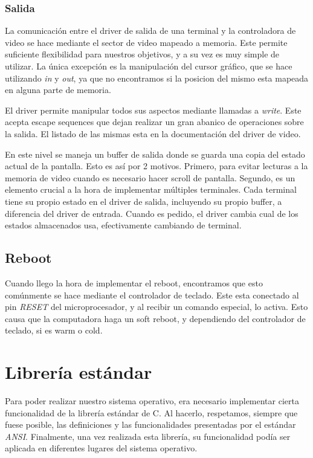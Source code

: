\documentclass[a4paper,10pt]{article}
\begin{document}
        \subsubsection{Salida}
            La comunicación entre el driver de salida de una terminal y la controladora de video se hace mediante el sector de video mapeado a memoria.
            Este permite suficiente flexibilidad para nuestros objetivos, y a su vez es muy simple de utilizar.
            La única excepción es la manipulación del cursor gráfico, que se hace utilizando \textit{in} y \textit{out}, ya que no encontramos si la posicion del mismo esta mapeada en alguna parte de memoria.

            El driver permite manipular todos sus aspectos mediante llamadas a \textit{write}.
            Este acepta escape sequences que dejan realizar un gran abanico de operaciones sobre la salida.
            El listado de las mismas esta en la documentación del driver de video.
            
            En este nivel se maneja un buffer de salida donde se guarda una copia del estado actual de la pantalla.
            Esto es así por 2 motivos.
            Primero, para evitar lecturas a la memoria de video cuando es necesario hacer scroll de pantalla.
            Segundo, es un elemento crucial a la hora de implementar múltiples terminales.
            Cada terminal tiene su propio estado en el driver de salida, incluyendo su propio buffer, a diferencia del driver de entrada.
            Cuando es pedido, el driver cambia cual de los estados almacenados usa, efectivamente cambiando de terminal.

    \subsection{Reboot} 
        Cuando llego la hora de implementar el reboot, encontramos que esto comúnmente se hace mediante el controlador de teclado.
        Este esta conectado al pin \textit{RESET} del microprocesador, y al recibir un comando especial, lo activa.
        Esto causa que la computadora haga un soft reboot, y dependiendo del controlador de teclado, si es warm o cold.

\section{Librería estándar}
    Para poder realizar nuestro sistema operativo, era necesario implementar cierta funcionalidad de la librería estándar de C. Al hacerlo, respetamos, siempre que fuese posible, las definiciones y las funcionalidades presentadas por el estándar \textit{ANSI}.
    Finalmente, una vez realizada esta librería, su funcionalidad podía ser aplicada en diferentes lugares del sistema operativo.
\end{document}
